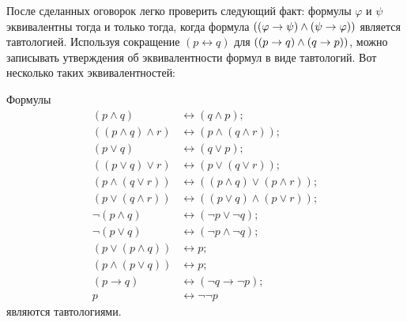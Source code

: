 После сделанных оговорок легко проверить следующий факт: формулы
$\varphi$ и $\psi$ эквивалентны тогда и только тогда, когда
формула $((\varphi\to\psi)\hm\land{(\psi\to\varphi))}$ является
тавтологией. Используя сокращение $(p\leftrightarrow q)$ для
$((p\to q)\hm\land{(q\to p)})$, можно записывать утверждения об
эквивалентности формул в виде тавтологий. Вот несколько таких
эквивалентностей:

\begin{theorem}
Формулы
        \begin{align*}
(p\land q) &\leftrightarrow (q \land p);\\
((p\land q) \land r) &\leftrightarrow (p\land (q \land r));\\
(p\lor q) &\leftrightarrow (q \lor p);\\
((p\lor q) \lor r) &\leftrightarrow (p\lor (q \lor r));\\
(p\land(q\lor r))&\leftrightarrow ((p\land q)\lor (p\land r));\\
(p\lor(q\land r))&\leftrightarrow ((p\lor q)\land (p\lor r));\\
\lnot(p\land q)&\leftrightarrow (\lnot p\lor \lnot q);\\
\lnot(p\lor q)&\leftrightarrow (\lnot p\land \lnot q);\\
(p\lor (p \land q))&\leftrightarrow p;\\
(p\land (p \lor q))&\leftrightarrow p;\\
(p\to q)&\leftrightarrow (\lnot q\to \lnot p);\\
p&\leftrightarrow \lnot\lnot p
        \end{align*}
являются тавтологиями.
\end{theorem}


